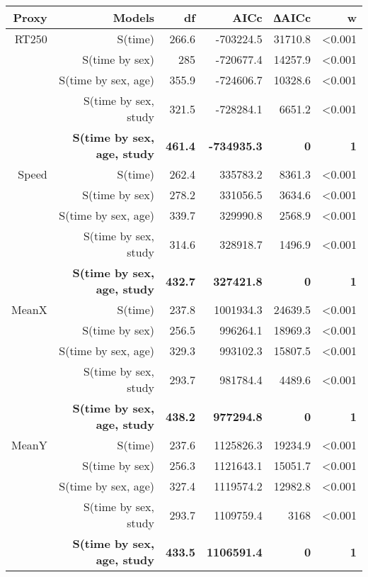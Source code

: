 \documentclass[a4paper,11pt]{article}
\begin{document}
\begin{table}[htbp]
    \begin{tabular}{rrrrrr}
    \\
    \hline  
    Proxy & Models & df    & AICc  & ∆AICc & w \\
    \hline
    RT250 & S(time) & 266.6 & -703224.5 & 31710.8 & <0.001 \\
          & S(time by sex) & 285   & -720677.4 & 14257.9 & <0.001 \\
          & S(time by sex, age) & 355.9 & -724606.7 & 10328.6 & <0.001 \\
          & S(time by sex, study & 321.5 & -728284.1 & 6651.2 & <0.001 \\
          & \textbf{S(time by sex, age, study} & \textbf{461.4} & \textbf{-734935.3} & \textbf{0} & \textbf{1} \\        
    \hline
    Speed & S(time) & 262.4 & 335783.2 & 8361.3 & <0.001 \\
          & S(time by sex) & 278.2 & 331056.5 & 3634.6 & <0.001 \\
          & S(time by sex, age) & 339.7 & 329990.8 & 2568.9 & <0.001 \\
          & S(time by sex, study & 314.6 & 328918.7 & 1496.9 & <0.001 \\
          & \textbf{S(time by sex, age, study} & \textbf{432.7} & \textbf{327421.8} & \textbf{0} & \textbf{1} \\
    \hline
    MeanX & S(time) & 237.8 & 1001934.3 & 24639.5 & <0.001 \\
          & S(time by sex) & 256.5 & 996264.1 & 18969.3 & <0.001 \\
          & S(time by sex, age) & 329.3 & 993102.3 & 15807.5 & <0.001 \\
          & S(time by sex, study & 293.7 & 981784.4 & 4489.6 & <0.001 \\
          & \textbf{S(time by sex, age, study} & \textbf{438.2} & \textbf{977294.8} & \textbf{0} & \textbf{1} \\       
    \hline
    MeanY & S(time) & 237.6 & 1125826.3 & 19234.9 & <0.001 \\
          & S(time by sex) & 256.3 & 1121643.1 & 15051.7 & <0.001 \\
          & S(time by sex, age) & 327.4 & 1119574.2 & 12982.8 & <0.001 \\
          & S(time by sex, study & 293.7 & 1109759.4 & 3168  & <0.001 \\
          & \textbf{S(time by sex, age, study} & \textbf{433.5} & \textbf{1106591.4} & \textbf{0} & \textbf{1} \\
    \hline 
    \end{tabular}
  \label{tab:addlabel}
  \end{table}
 
\end{document}

